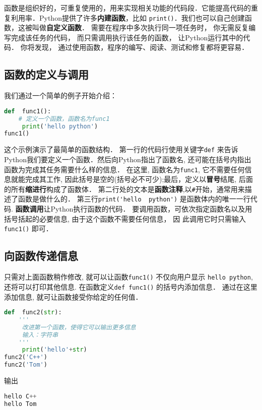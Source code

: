 函数是组织好的，可重复使用的，用来实现相关功能的代码段．它能提高代码的重复利用率．Python提供了许多\textbf{内建函数}，比如 \verb|print()|．我们也可以自己创建函数，这被叫做\textbf{自定义函数}． 需要在程序中多次执行同一项任务时， 你无需反复编写完成该任务的代码， 而只需调用执行该任务的函数， 让Python运行其中的代码． 你将发现， 通过使用函数，程序的编写、阅读、测试和修复都将更容易．

\subsection{函数的定义与调用}
我们通过一个简单的例子开始介绍：
\begin{lstlisting}[language=python]
def  func1():
    # 定义一个函数，函数名为func1
     print('hello python')
func1()
\end{lstlisting}
这个示例演示了最简单的函数结构． 第一行的代码行使用关键字\verb|def| 来告诉Python我们要定义一个函数．然后向Python指出了函数名, 还可能在括号内指出函数为完成其任务需要什么样的信息． 在这里, 函数名为\verb|func1|, 它不需要任何信息就能完成其工作, 因此括号是空的(括号必不可少);最后，定义以\textbf{冒号}结尾, 后面的所有\textbf{缩进行}构成了函数体． 第二行处的文本是\textbf{函数注释},以\verb|#|开始，通常用来描述了函数是做什么的．
第三行\verb|print('hello  python')| 是函数体内的唯一一行代码.
\textbf{函数调用}让Python执行函数的代码． 要调用函数，可依次指定函数名以及用括号括起的必要信息, 由于这个函数不需要任何信息， 因
此调用它时只需输入\verb|func1()| 即可．
\subsection{向函数传递信息}
只需对上面函数稍作修改, 就可以让函数\verb|func1()| 不仅向用户显示 \verb|hello python|, 还将可以打印其他信息. 在函数定义\verb|def func1()| 的括号内添加信息． 通过在这里添加信息, 就可让函数接受你给定的任何值．
\begin{lstlisting}[language=python]
def  func2(str):
    '''
     改进第一个函数，使得它可以输出更多信息
     输入：字符串
    '''
     print('hello'+str)
func2('C++')
func2('Tom')
\end{lstlisting}
输出
\begin{lstlisting}[language=python]
hello C++
hello Tom
\end{lstlisting}
